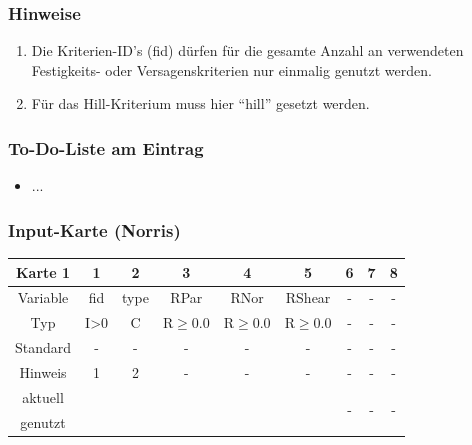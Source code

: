 \documentclass[11pt,titlepage,listof=totoc,bibliography=totoc,twoside]{scrreprt}
\begin{document}
{{\subsubsection{Hinweise}

\begin{enumerate}
\item Die Kriterien-ID's (fid) dürfen für die gesamte Anzahl an verwendeten Festigkeits- oder Versagenskriterien nur einmalig genutzt werden.
\item Für das Hill-Kriterium muss hier ``hill'' gesetzt werden.
\end{enumerate}

\subsubsection{To-Do-Liste am Eintrag}

\begin{itemize}
\item ...
\end{itemize}

\newpage

\subsubsection{Input-Karte (Norris)}

\begin{table}[htbp]
\centering
\begin{tabularx}{\textwidth}{cCCCCCCCC}
\toprule
Karte 1	& 1		& 2		& 3		& 4		& 5		& 6		& 7		& 8		\\
\midrule
Variable& fid		& type		& RPar		& RNor		& RShear	& -		& -		& -		\\
Typ	& I>0		& C		& R$\ge$0.0	& R$\ge$0.0	& R$\ge$0.0	& -		& -		& -		\\
Standard& -		& -		& -		& -		& -		& -		& -		& -		\\
Hinweis	& 1		& 2		& -		& -		& -		& -		& -		& -		\\
aktuell	& 	& 	& 	& 	& 	& 	& \multirow{2}{*}{-}	& 	\\
genutzt \\
\bottomrule
\end{tabularx}
\end{table}

}}
\end{document}
